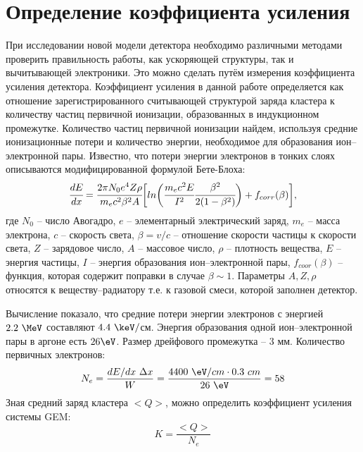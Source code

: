 \section{Определение коэффициента усиления}
При исследовании новой модели детектора необходимо различными методами проверить правильность работы, как ускоряющей структуры, так и вычитывающей электроники. Это можно сделать путём измерения коэффициента усиления детектора. 
Коэффициент усиления в данной работе определяется как отношение зарегистрированного считывающей структурой заряда кластера к количеству частиц первичной ионизации, образованных в индукционном промежутке. 
Количество частиц первичной ионизации найдем, используя средние ионизационные потери и количество энергии, необходимое для образования ион--электронной пары. Известно, что потери энергии электронов в тонких слоях описываются модифицированной формулой Бете-Блоха:
\begin{equation}
\cfrac{dE}{dx} = \cfrac{2\pi N_0 e^4 Z\rho}{m_e c^2 \beta^2 A}\biggl[ln \bigg(\cfrac{ m_ec^2E}{I^2}\cfrac{\beta^2}{2(1-\beta^2)}\bigg) + f_{corr}(\beta)\biggr],
\label{eq:Bethe_Bloch}
\end{equation}
где $N_0$ -- число Авогадро, $e$ -- элементарный электрический заряд, $m_e$ -- масса электрона, $c$ -- скорость света, $\beta = v/c$ -- отношение скорости частицы к скорости света, $Z$ -- зарядовое число, $A$ -- массовое число, $\rho$ -- плотность вещества, $E$ -- энергия частицы, $I$ -- энергия образования ион--электронной пары, $f_{coor}(\beta)$ -- функция, которая содержит поправки в случае $\beta \sim 1$. Параметры $A,Z,\rho$ относятся к веществу--радиатору т.е. к газовой смеси, которой заполнен детектор.
\par Вычисление показало, что средние потери энергии электронов с энергией $2.2~\MeV$ составляют $4.4~\keV/$см. Энергия образования одной ион--электронной пары в аргоне есть $26\eV$. Размер дрейфового промежутка -- 3 мм. Количество первичных электронов:
\begin{equation}
	N_e = \frac{dE/dx~\Delta x}{W} =\frac {4400~\eV/cm \cdot 0.3~cm}{26~\eV} = 58
\end{equation}
Зная средний заряд кластера $<Q>$, можно определить коэффициент усиления системы GEM: 
\begin{equation}
K = \frac{<Q>}{N_e}
\end{equation}
